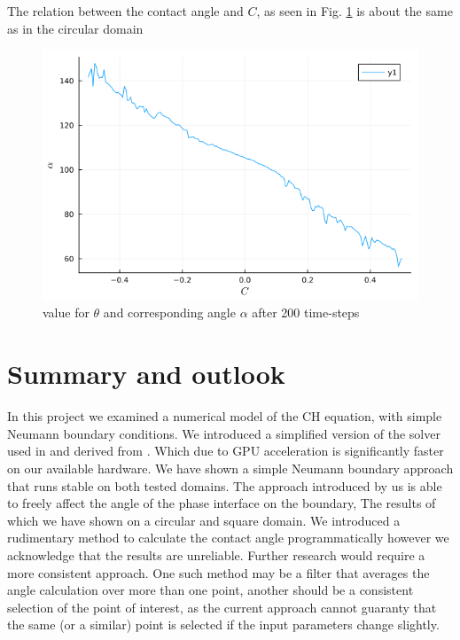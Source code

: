 \documentclass{mimosis}
\begin{document}
The relation between the contact angle and \(C\), as seen in Fig. \ref{fig:angle-table-square} is about the same as in the circular domain
\begin{figure}[htbp]
\centering
\includegraphics[width=.9\linewidth]{images/angle-values-square.png}
\caption{\label{fig:angle-table-square}value for \(\theta\) and corresponding angle \(\alpha\) after 200 time-steps}
\end{figure}
\chapter{Summary and outlook}
\label{sec:orga954a56}
In this project we examined a numerical model of the CH equation, with simple Neumann boundary conditions. We introduced a simplified version of the solver used in \autocite{Ulmer_CHRelaxed_2024} and derived from \autocite{SHIN20117441}. Which due to GPU acceleration is significantly faster on our available hardware. We have shown a simple Neumann boundary approach that runs stable on both tested domains. The approach introduced by us is able to freely affect the angle of the phase interface on the boundary, The results of which we have shown on a circular and square domain. We introduced a rudimentary method to calculate the contact angle programmatically however we acknowledge that the results are unreliable. Further research would require a more consistent approach. One such method may be a filter that averages the angle calculation over more than one point, another should be a consistent selection of the point of interest, as the current approach cannot guaranty that the same (or a similar) point is selected if the input parameters change slightly.
\end{document}
